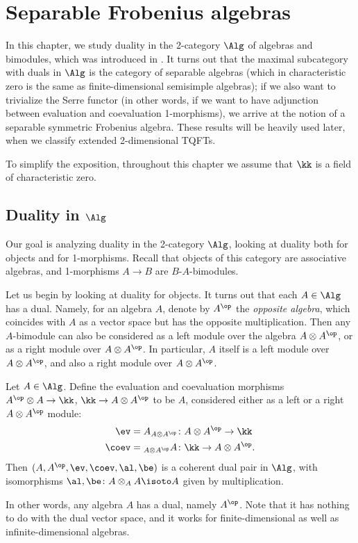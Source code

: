 \chapter{Separable Frobenius algebras}\label{c:separable-frobenius}

In this chapter, we study duality in the 2-category $\Alg$ of algebras and
bimodules, which was introduced in . It turns out that the maximal
subcategory with duals in $\Alg$ is the category of separable algebras (which in
characteristic zero is the same as finite-dimensional semisimple algebras); if
we also want to trivialize the Serre functor (in other words, if we want to have
adjunction between evaluation and coevaluation 1-morphisms), we arrive at the
notion of a separable symmetric Frobenius algebra. These results will be heavily
used later, when we classify extended 2-dimensional TQFTs.

To simplify the exposition, throughout this chapter we assume that $\kk$ is a
field of characteristic zero.

\section{Duality in $\Alg$}\label{s:alg-duals}
Our goal is analyzing duality in the 2-category $\Alg$, looking at duality
both for objects and for 1-morphisms. Recall that objects of this category are
associative algebras, and 1-morphisms $A\to B$ are $B$-$A$-bimodules.


Let us begin by looking at duality for objects. It turns out that each $A\in
\Alg$ has a dual. Namely, for an algebra $A$, denote by
$A^\op$ the \emph{opposite algebra}, which coincides with $A$ as a vector space
but has the opposite multiplication. Then any $A$-bimodule can also be considered
as a left module over the algebra $A\otimes A^\op$, or as a right module over
$A\otimes A^\op$. In particular, $A$ itself is a left module over $A\otimes
A^\op$, and also a right module over $A\otimes
A^\op$.


\begin{theorem}\label{t:alg-duals1}
  Let $A\in \Alg$. Define the evaluation and coevaluation morphisms
  $A^\op \otimes A\to \kk$, $\kk \to A\otimes A^\op$
  to be $A$, considered either as a left or a right $A\otimes A^\op$ module:
  \begin{equation}\label{e:alg-duals1}
    \begin{aligned}
      \ev &= A_{A\otimes A^\op} \colon A\otimes A^\op\to \kk\\
      \coev &= {}_{A\otimes A^\op} A \colon \kk \to A\otimes A^\op.
    \end{aligned}
  \end{equation}
  Then $(A, A^\op, \ev, \coev, \al,\be)$ is a coherent dual pair in $\Alg$,
  with isomorphisms $\al, \be\colon A\otimes_A A \isoto A$ given by
  multiplication.
\end{theorem}
In other words, any algebra $A$ has a dual, namely $A^\op$.
Note that it has nothing to do with the dual vector space, and
it works for finite-dimensional as well as infinite-dimensional algebras.

